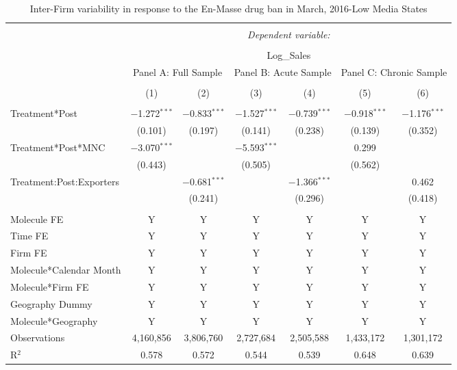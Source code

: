 \documentclass[AER]{AEA}
\theoremstyle{theorem}
\begin{document}
\begin{table}[h!] \centering
	\caption{Inter-Firm variability in response to the En-Masse drug ban in March, 2016-Low Media States} 
	\label{Table-R-3} 
	\footnotesize
	\begin{tabular}{@{\extracolsep{1pt}}lcccccc} 
		\\[-1.8ex]\hline 
		\hline \\[-1.8ex] 
		& \multicolumn{6}{c}{\textit{Dependent variable:}} \\ 
		\cline{2-7} 
		\\[-1.8ex] & \multicolumn{6}{c}{Log\_Sales} \\ 
		& \multicolumn{2}{c}{Panel A: Full Sample} & \multicolumn{2}{c}{Panel B: Acute Sample} & \multicolumn{2}{c}{Panel C: Chronic Sample} \\ 
		\\[-1.8ex] & (1) & (2) & (3) & (4) & (5) & (6)\\ 
		\hline \\[-1.8ex] 
		Treatment*Post & $-$1.272$^{***}$ & $-$0.833$^{***}$ & $-$1.527$^{***}$ & $-$0.739$^{***}$ & $-$0.918$^{***}$ & $-$1.176$^{***}$ \\ 
		& (0.101) & (0.197) & (0.141) & (0.238) & (0.139) & (0.352) \\ 
		Treatment*Post*MNC & $-$3.070$^{***}$ &  & $-$5.593$^{***}$ &  & 0.299 &  \\ 
		& (0.443) &  & (0.505) &  & (0.562) &  \\ 
		Treatment:Post:Exporters &  & $-$0.681$^{***}$ &  & $-$1.366$^{***}$ &  & 0.462 \\ 
		&  & (0.241) &  & (0.296) &  & (0.418) \\ 
		\hline \\[-1.8ex] 
		Molecule FE & Y & Y & Y & Y & Y & Y \\ 
		Time FE & Y & Y & Y & Y & Y & Y \\ 
		Firm FE & Y & Y & Y & Y & Y & Y \\ 
		Molecule*Calendar Month & Y & Y & Y & Y & Y & Y \\ 
		Molecule*Firm FE & Y & Y & Y & Y & Y & Y \\ 
		Geography Dummy & Y & Y & Y & Y & Y & Y \\ 
		Molecule*Geography & Y & Y & Y & Y & Y & Y \\ 
		Observations & 4,160,856 & 3,806,760 & 2,727,684 & 2,505,588 & 1,433,172 & 1,301,172 \\ 
		R$^{2}$ & 0.578 & 0.572 & 0.544 & 0.539 & 0.648 & 0.639 \\ 

\end{tabular}
\end{table}
\end{document}

